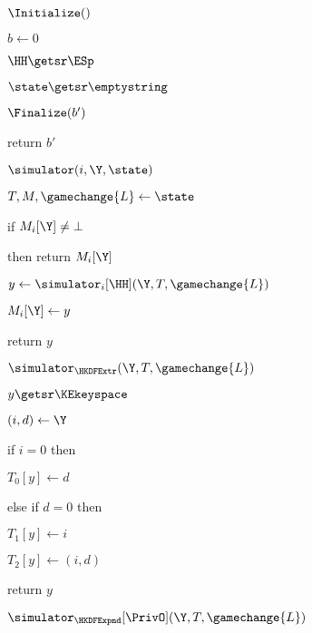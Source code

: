 \begin{figure}[tp]
\begin{minipage}[t]{0.48\textwidth}
		\begin{algorithm}{$\Initialize()$}
			\item $b \gets 0$
			\item $\HH \getsr \ESp$
			\item $\state \getsr \emptystring$
		\end{algorithm}
		\ExptSepSpace
		\begin{algorithm}{$\Finalize(b')$}
			\item {}
			\item return $b'$
		\end{algorithm}
		\ExptSepSpace			
		\begin{oracle}{$\simulator(i, \Y,\state)$}
			\item $T, M, \gamechange{L} \gets \state$
			\item if $M_{i}[\Y] \neq \bot$
			\item \quad then return $M_{i}[\Y]$
			\item $y \gets \simulator_{i}[\HH](\Y, T,\gamechange{L})$
			\item $M_{i}[\Y]\gets y$
			\item return $y$
		\end{oracle}
		\ExptSepSpace	
			\begin{oracle}{$\simulator_{\HKDFExtr}(\Y, T, \gamechange{L})$}
				\item $y \getsr \KEkeyspace$
				\item {}
				\item {} \item \quad {}
				\item {}
				\item $(i, d) \gets \Y$
				\item if $i = 0$ then 
				\item \quad $T_{0}[y] \gets d$
				\item else if $d = 0$ then 
				\item \quad $T_{1}[y] \gets i$
				\item $T_{2}[y] \gets (i,d)$
				\item return $y$
			\end{oracle}
		\end{minipage}
		\begin{minipage}[t]{0.49\textwidth}
			\ExptSepSpace
			\begin{oracle}{$\simulator_{\HKDFExpnd}[\PrivO](\Y, T, \gamechange{L})$}

\end{oracle}
\end{minipage}
\end{figure}
